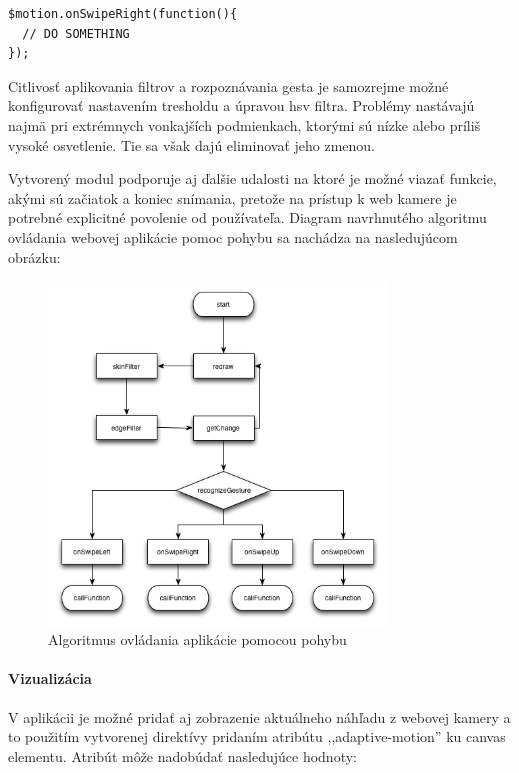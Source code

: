 \begin{lstlisting}
$motion.onSwipeRight(function(){
  // DO SOMETHING
});
\end{lstlisting}

Citlivosť aplikovania filtrov a rozpoznávania gesta je samozrejme možné konfigurovať nastavením tresholdu a úpravou hsv filtra. Problémy nastávajú najmä pri extrémnych vonkajších podmienkach, ktorými sú nízke alebo príliš vysoké osvetlenie. Tie sa však dajú eliminovať jeho zmenou.

Vytvorený modul podporuje aj ďalšie udalosti na ktoré je možné viazať funkcie, akými sú začiatok a koniec snímania, pretože na prístup k web kamere je potrebné explicitné povolenie od používateľa. Diagram navrhnutého algoritmu ovládania webovej aplikácie pomoc pohybu sa nachádza na nasledujúcom obrázku:

\begin{figure}[H]
  \centering
  \includegraphics[width=0.8\textwidth]{diagram/motion.png}
  \caption[Algoritmus ovládania aplikácie pomocou pohybu]{
    Algoritmus ovládania aplikácie pomocou pohybu}
  \label{fig: diamotion}
\end{figure}

\paragraph{Vizualizácia} %
\label{par:zobrazenie_n_h_adu}

V aplikácii je možné pridať aj zobrazenie aktuálneho náhľadu z webovej kamery a to použitím vytvorenej direktívy pridaním atribútu ,,adaptive-motion'' ku canvas elementu. Atribút môže nadobúdať nasledujúce hodnoty:

